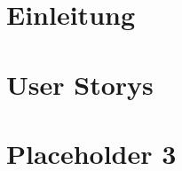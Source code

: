 









\tableofcontents
\newpage
\listoffigures
%


\chapter{Einleitung}


\chapter{User Storys}


\chapter{Placeholder 3}



\renewcommand{\bibname}{References}



